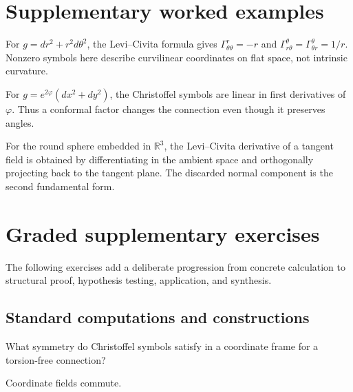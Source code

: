 \section{Supplementary worked examples}
\label{sec:vii22-pedagogy}

\begin{example}\label{ex:vii22-ped-01}
For \(g=dr^2+r^2d\theta^2\), the Levi--Civita formula gives \(\Gamma^r_{\theta\theta}=-r\) and \(\Gamma^\theta_{r\theta}=\Gamma^\theta_{\theta r}=1/r\).  Nonzero symbols here describe curvilinear coordinates on flat space, not intrinsic curvature.
\end{example}

\begin{example}\label{ex:vii22-ped-02}
For \(g=e^{2\varphi}(dx^2+dy^2)\), the Christoffel symbols are linear in first derivatives of \(\varphi\).  Thus a conformal factor changes the connection even though it preserves angles.
\end{example}

\begin{example}\label{ex:vii22-ped-03}
For the round sphere embedded in \(\mathbb R^3\), the Levi--Civita derivative of a tangent field is obtained by differentiating in the ambient space and orthogonally projecting back to the tangent plane.  The discarded normal component is the second fundamental form.
\end{example}

\section{Graded supplementary exercises}
The following exercises add a deliberate progression from concrete calculation to structural proof, hypothesis testing, application, and synthesis.

\subsection*{Standard computations and constructions}

\begin{exercise}\label{exr:vii22-ped-01}
What symmetry do Christoffel symbols satisfy in a coordinate frame for a torsion-free connection?
\end{exercise}

\begin{hint}
Coordinate fields commute.
\end{hint}

